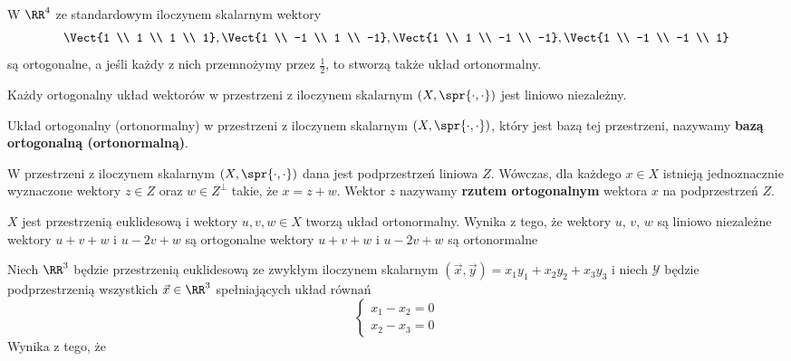 \begin{example}
    W $\RR^4$ ze standardowym iloczynem skalarnym wektory 
    $$\Vect{1 \\ 1 \\ 1 \\ 1}, \Vect{1 \\ -1 \\ 1 \\ -1}, \Vect{1 \\ 1 \\ -1 \\ -1}, \Vect{1 \\ -1 \\ -1 \\ 1}$$
    są ortogonalne, a jeśli każdy z nich przemnożymy przez $\frac{1}{2}$, to stworzą także układ ortonormalny.
\end{example}

Każdy ortogonalny układ wektorów w przestrzeni z iloczynem skalarnym $(X,\spr{\cdot,\cdot})$ jest liniowo niezależny.

Układ ortogonalny (ortonormalny) w przestrzeni z iloczynem skalarnym $(X,\spr{\cdot,\cdot})$, który jest bazą tej przestrzeni, nazywamy \textbf{bazą ortogonalną (ortonormalną)}.

W przestrzeni z iloczynem skalarnym $(X,\spr{\cdot,\cdot})$ dana jest podprzestrzeń liniowa $Z$. Wówczas, dla każdego $x\in X$ istnieją jednoznacznie wyznaczone wektory $z\in Z$ oraz $w\in Z^\perp$ takie, że $x=z+w$. Wektor $z$ nazywamy \textbf{rzutem ortogonalnym} wektora $x$ na podprzestrzeń $Z$.

\begin{problems}
    \prob $X$ jest przestrzenią euklidesową i wektory $u, v, w \in X$ tworzą układ ortonormalny. Wynika z tego, że
    \answers
    {wektory $u$, $v$, $w$ są liniowo niezależne}
    {wektory $u+v+w$ i $u-2v+w$ są ortogonalne}
    {wektory $u+v+w$ i $u-2v+w$ są ortonormalne}
    
    \prob Niech $\RR^3$ będzie przestrzenią euklidesową ze zwykłym iloczynem skalarnym $(\vec{x}, \vec{y}) = x_1y_1 + x_2y_2 + x_3y_3$ i niech $\mathcal{Y}$ będzie podprzestrzenią wszystkich $\vec{x}\in\RR^3$ spełniających układ równań
    $$
    \begin{cases}
        x_1 - x_2 = 0 \\
        x_2 - x_3 = 0
    \end{cases}
    $$
    Wynika z tego, że
\end{problems}

